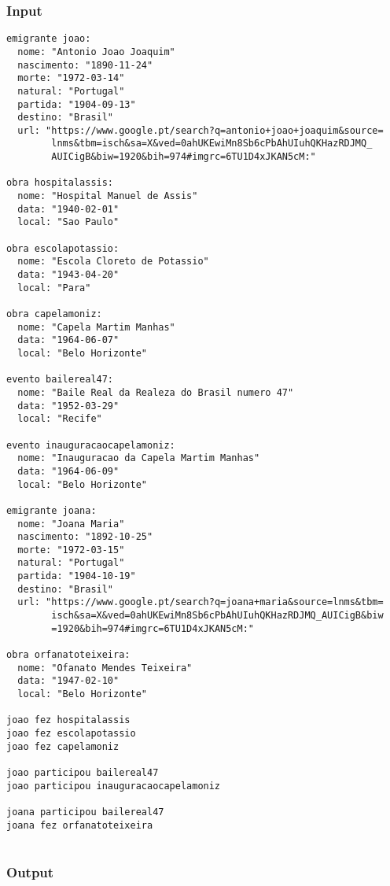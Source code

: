 \documentclass[a4paper]{article}
\begin{document}
\subsubsection{Input}

\lstset{language=tex}
\begin{lstlisting}
emigrante joao:
  nome: "Antonio Joao Joaquim"
  nascimento: "1890-11-24"
  morte: "1972-03-14"
  natural: "Portugal"
  partida: "1904-09-13"
  destino: "Brasil"
  url: "https://www.google.pt/search?q=antonio+joao+joaquim&source=
        lnms&tbm=isch&sa=X&ved=0ahUKEwiMn8Sb6cPbAhUIuhQKHazRDJMQ_
        AUICigB&biw=1920&bih=974#imgrc=6TU1D4xJKAN5cM:"

obra hospitalassis:
  nome: "Hospital Manuel de Assis"
  data: "1940-02-01"
  local: "Sao Paulo"

obra escolapotassio:
  nome: "Escola Cloreto de Potassio"
  data: "1943-04-20"
  local: "Para"

obra capelamoniz:
  nome: "Capela Martim Manhas"
  data: "1964-06-07"
  local: "Belo Horizonte"

evento bailereal47:
  nome: "Baile Real da Realeza do Brasil numero 47"
  data: "1952-03-29"
  local: "Recife"

evento inauguracaocapelamoniz:
  nome: "Inauguracao da Capela Martim Manhas"
  data: "1964-06-09"
  local: "Belo Horizonte"

emigrante joana:
  nome: "Joana Maria"
  nascimento: "1892-10-25"
  morte: "1972-03-15"
  natural: "Portugal"
  partida: "1904-10-19"
  destino: "Brasil"
  url: "https://www.google.pt/search?q=joana+maria&source=lnms&tbm=
        isch&sa=X&ved=0ahUKEwiMn8Sb6cPbAhUIuhQKHazRDJMQ_AUICigB&biw
        =1920&bih=974#imgrc=6TU1D4xJKAN5cM:"

obra orfanatoteixeira:
  nome: "Ofanato Mendes Teixeira"
  data: "1947-02-10"
  local: "Belo Horizonte"

joao fez hospitalassis
joao fez escolapotassio
joao fez capelamoniz

joao participou bailereal47
joao participou inauguracaocapelamoniz

joana participou bailereal47
joana fez orfanatoteixeira


\end{lstlisting}

\pagebreak
\subsubsection{Output}
\end{document}
